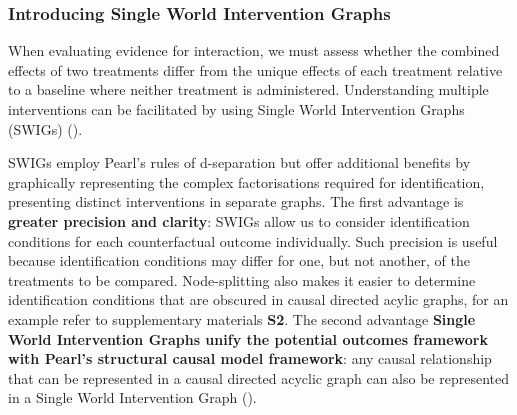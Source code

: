 \documentclass[
  single column]{article}
\begin{document}
\subsubsection{Introducing Single World Intervention
Graphs}\label{introducing-single-world-intervention-graphs}

When evaluating evidence for interaction, we must assess whether the
combined effects of two treatments differ from the unique effects of
each treatment relative to a baseline where neither treatment is
administered. Understanding multiple interventions can be facilitated by
using Single World Intervention Graphs (SWIGs)
().

SWIGs employ Pearl's rules of d-separation but offer additional benefits
by graphically representing the complex factorisations required for
identification, presenting distinct interventions in separate graphs.
The first advantage is \textbf{greater precision and clarity}: SWIGs
allow us to consider identification conditions for each counterfactual
outcome individually. Such precision is useful because identification
conditions may differ for one, but not another, of the treatments to be
compared. Node-splitting also makes it easier to determine
identification conditions that are obscured in causal directed acylic
graphs, for an example refer to supplementary materials \textbf{S2}. The
second advantage \textbf{Single World Intervention Graphs unify the
potential outcomes framework with Pearl's structural causal model
framework}: any causal relationship that can be represented in a causal
directed acyclic graph can also be represented in a Single World
Intervention Graph ().
\end{document}
